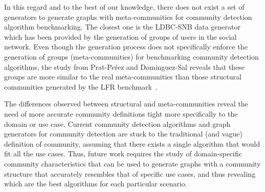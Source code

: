 In this regard and to the best of our knowledge, there does not exist a set of
generators to generate graphs with meta-communities for community detection
algorithm benchmarking. The closest one is the LDBC-SNB data
generator~\cite{Erling:2015:LSN:2723372.2742786} which has been provided by the
generation of groups of users in the social network. Even though the generation
process does not specifically enforce the generation of groups
(meta-communities) for benchmarking community detection algorithms, the study
from Prat-Pe\'rez and Dominguez-Sal reveals that these groups are more similar
to the real meta-communities than those structural communities generated by the
LFR benchmark~\cite{Prat-Perez:2014:CSS:2621934.2621942}.

The differences observed between structural and meta-communities reveal the need
of more accurate community definitions tight more specifically to the domain or
use case. Current community detection algorithms and graph generators for
community detection are stuck to the traditional (and vague) definition of
community, assuming that there exists a single algorithm that would fit all the
use cases. Thus, future work requires the study of domain-specific community
characteristics that can be used to generate graphs with a community structure
that accurately resembles that of specific use cases, and thus revealing which
are the best algorithms for each particular scenario.

